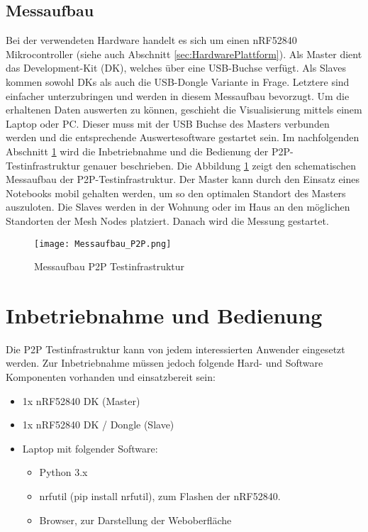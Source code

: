 \subsection{Messaufbau}\label{sec:Messaufbau}
Bei der verwendeten Hardware handelt es sich um einen nRF52840 Mikrocontroller (siehe auch Abschnitt \ref{sec:HardwarePlattform}).
Als Master dient das Development-Kit (DK), welches über eine USB-Buchse verfügt.
Als Slaves kommen sowohl DKs als auch die USB-Dongle Variante in Frage.
Letztere sind einfacher unterzubringen und werden in diesem Messaufbau bevorzugt.
Um die erhaltenen Daten auswerten zu können, geschieht die Visualisierung mittels einem Laptop oder PC.
Dieser muss mit der USB Buchse des Masters verbunden werden und die entsprechende Auswertesoftware gestartet sein.
Im nachfolgenden Abschnitt \ref{sec:InbetriebnahmeBedienungP2P} wird die Inbetriebnahme und die Bedienung der P2P-Testinfrastruktur genauer beschrieben.
Die Abbildung \ref{fig:MessaufbauP2P} zeigt den schematischen Messaufbau der P2P-Testinfrastruktur. Der Master kann durch den Einsatz eines Notebooks mobil gehalten werden, um so den optimalen Standort des Masters auszuloten.
Die Slaves werden in der Wohnung oder im Haus an den möglichen Standorten der Mesh Nodes platziert. Danach wird die Messung gestartet.

\begin{figure} [H]
	\centering
	\texttt{[image: Messaufbau\_P2P.png]}
	\caption{Messaufbau P2P Testinfrastruktur}
	\label{fig:MessaufbauP2P}
\end{figure}


\newpage
\section{Inbetriebnahme und Bedienung}\label{sec:InbetriebnahmeBedienungP2P}
Die P2P Testinfrastruktur kann von jedem interessierten Anwender eingesetzt werden.
Zur Inbetriebnahme müssen jedoch folgende Hard- und Software Komponenten vorhanden und einsatzbereit sein: 

\begin{itemize}
	\item 1x nRF52840 DK (Master)
	\item 1x nRF52840 DK / Dongle (Slave)
	\item Laptop mit folgender Software:
	\begin{itemize}
		\item Python 3.x
		\item nrfutil (pip install nrfutil), zum Flashen der nRF52840.
		\item Browser, zur Darstellung der Weboberfläche
	\end{itemize}
\end{itemize}

